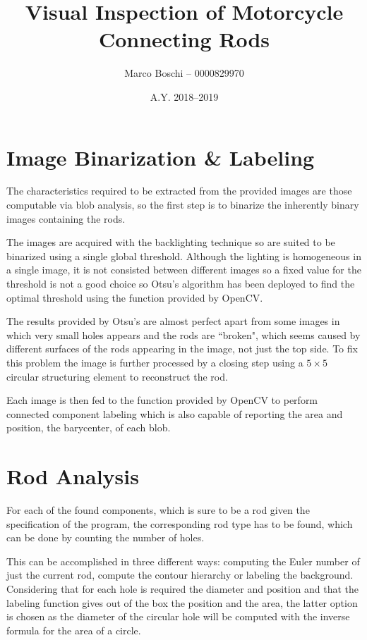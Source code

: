 

\title{Visual Inspection of Motorcycle Connecting Rods}
\date{A.Y. 2018--2019}
\author{Marco Boschi -- 0000829970}




\section{Image Binarization \& Labeling}
The characteristics required to be extracted from the provided images are those computable via blob analysis, so the first step is to binarize the inherently binary images containing the rods.

The images are acquired with the backlighting technique so are suited to be binarized using a single global threshold.
Although the lighting is homogeneous in a single image, it is not consisted between different images so a fixed value for the threshold is not a good choice so Otsu's algorithm has been deployed to find the optimal threshold using the function provided by OpenCV.

The results provided by Otsu's are almost perfect apart from some images in which very small holes appears and the rods are ``broken", which seems caused by different surfaces of the rods appearing in the image, not just the top side.
To fix this problem the image is further processed by a closing step using a $5\times 5$ circular structuring element to reconstruct the rod.

Each image is then fed to the function provided by OpenCV to perform connected component labeling which is also capable of reporting the area and position, \ie the barycenter, of each blob.

\section{Rod Analysis}
For each of the found components, which is sure to be a rod given the specification of the program, the corresponding rod type has to be found, which can be done by counting the number of holes.

This can be accomplished in three different ways: computing the Euler number of just the current rod, compute the contour hierarchy or labeling the background.
Considering that for each hole is required the diameter and position and that the labeling function gives out of the box the position and the area, the latter option is chosen as the diameter of the circular hole will be computed with the inverse formula for the area of a circle.

